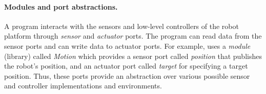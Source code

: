 \paragraph{Modules and port abstractions.}
A \lgname program interacts with the sensors and low-level controllers of the robot platform through \emph{sensor} and \emph{actuator} ports.
%
%
The program can read data from the sensor ports and can write data to actuator ports.
%
For example, \LineForm uses a \emph{module} (library) called \emph{Motion} which provides a sensor port called \emph{position} that publishes the robot's position, and an actuator port called \emph{target} for specifying a target position.
%
Thus, these  ports provide an abstraction over various possible sensor and controller implementations and environments.
%


%
%
%

